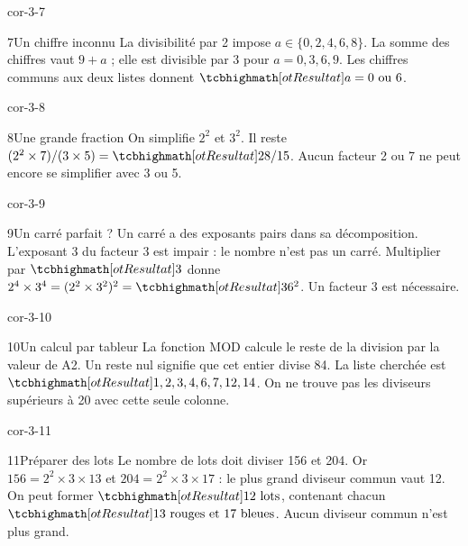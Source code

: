 \begin{blocLivre}{cor-3-7}\begin{corrige}{7}{Un chiffre inconnu}
La divisibilité par 2 impose $a\in\{0,2,4,6,8\}$. La somme des chiffres vaut $9+a$ ; elle est divisible par 3 pour $a=0,3,6,9$. Les chiffres communs aux deux listes donnent $\res{a=0\text{ ou }6}$.
\end{corrige}\end{blocLivre}
\begin{blocLivre}{cor-3-8}\begin{corrige}{8}{Une grande fraction}
On simplifie $2^2$ et $3^2$. Il reste $(2^2\times7)/(3\times5)=\res{28/15}$. Aucun facteur 2 ou 7 ne peut encore se simplifier avec 3 ou 5.
\end{corrige}\end{blocLivre}
\begin{blocLivre}{cor-3-9}\begin{corrige}{9}{Un carré parfait ?}
Un carré a des exposants pairs dans sa décomposition. L’exposant 3 du facteur 3 est impair : le nombre n’est pas un carré. Multiplier par $\res3$ donne $2^4\times3^4=(2^2\times3^2)^2=\res{36^2}$. Un facteur 3 est nécessaire.
\end{corrige}\end{blocLivre}
\begin{blocLivre}{cor-3-10}\begin{corrige}{10}{Un calcul par tableur}
La fonction MOD calcule le reste de la division par la valeur de A2. Un reste nul signifie que cet entier divise 84. La liste cherchée est $\res{1,2,3,4,6,7,12,14}$. On ne trouve pas les diviseurs supérieurs à 20 avec cette seule colonne.
\end{corrige}\end{blocLivre}
\begin{blocLivre}{cor-3-11}\begin{corrige}{11}{Préparer des lots}
Le nombre de lots doit diviser 156 et 204. Or $156=2^2\times3\times13$ et $204=2^2\times3\times17$ : le plus grand diviseur commun vaut 12. On peut former $\res{12\text{ lots}}$, contenant chacun $\res{13\text{ rouges et }17\text{ bleues}}$. Aucun diviseur commun n’est plus grand.
\end{corrige}\end{blocLivre}
